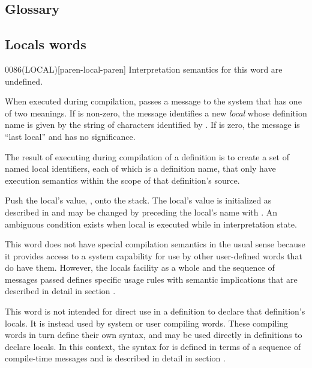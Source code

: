 \begin{intro}
\subsection{Glossary} %
\end{intro}

\subsection{Locals words} %

\begin{worddef}[LOCAL]{0086}{(LOCAL)}[paren-local-paren]
\interpret
	Interpretation semantics for this word are undefined.

\execute

	When executed during compilation,  passes a
	message to the system that has one of two meanings. If 
	is non-zero, the message identifies a new \emph{local} whose
	definition name is given by the string of characters identified
	by . If  is zero, the message is ``last
	local'' and  has no significance.

	The result of executing  during compilation of a
	definition is to create a set of named local identifiers, each
	of which is a definition name, that only have execution
	semantics within the scope of that definition's source.

\execute[local]

	Push the local's value, , onto the stack. The local's
	value is initialized as described in  and may be changed by preceding the local's
	name with . An ambiguous condition exists when local is
	executed while in interpretation state.

\note
	This word does not have special compilation semantics in the
	usual sense because it provides access to a system capability
	for use by other user-defined words that do have them. However,
	the locals facility as a whole and the sequence of messages
	passed defines specific usage rules with semantic implications
	that are described in detail in section
	.

\note
	This word is not intended for direct use in a definition to
	declare that definition's locals. It is instead used by system
	or user compiling words. These compiling words in turn define
	their own syntax, and may be used directly in definitions to
	declare locals. In this context, the syntax for 
	is defined in terms of a sequence of compile-time messages and
	is described in detail in section .


\end{worddef}
